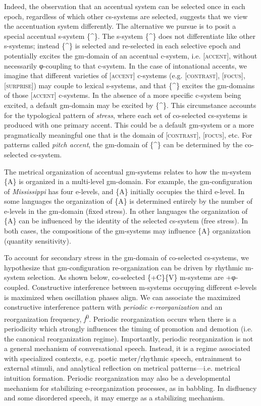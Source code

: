   Indeed, the observation that an accentual system can be selected once in each epoch, regardless of which other cs-systems are selected, suggests that we view the accentuation system differently. The alternative we pursue is to posit a special accentual s-system \{\^{}\}. The s-system \{\^{}\} does not differentiate like other s-systems; instead \{\^{}\} is selected and re-selected in each selective epoch and potentially excites the gm-domain of an accentual c-system, i.e. [\textsc{accent}], without necessarily φ-coupling to that c-system. In the case of intonational accents, we imagine that different varieties of [\textsc{accent}] c-systems (e.g. [\textsc{contrast}], [\textsc{focus}], [\textsc{surprise}]) may couple to lexical s-systems, and that \{\^{}\} excites the gm-domains of those [\textsc{accent}] c-systems. In the absence of a more specific c-system being excited, a default gm-domain may be excited by \{\^{}\}. This circumstance accounts for the typological pattern of \textit{stress}, where each set of co-selected cs-systems is produced with one primary accent. This could be a default gm-system or a more pragmatically meaningful one that is the domain of [\textsc{contrast}], [\textsc{focus}], etc. For patterns called \textit{pitch accent}, the gm-domain of \{\^{}\} can be determined by the co-selected cs-system.

  The metrical organization of accentual gm-systems relates to how the m-system \{A\} is organized in a multi-level gm-domain. For example, the gm-configuration of \textit{Mississippi} has four e-levels, and \{A\} initially occupies the third e-level. In some languages the organization of \{A\} is determined entirely by the number of e-levels in the gm-domain (fixed stress). In other languages the organization of \{A\} can be influenced by the identity of the selected cs-system (free stress). In both cases, the compositions of the gm-systems may influence \{A\} organization (quantity sensitivity). 

  To account for secondary stress in the gm-domain of co-selected cs-systems, we hypothesize that gm-configuration re-organization can be driven by rhythmic m-system selection. As shown below, co-selected \{+C\}\{V\} m-systems are +φ-coupled. Constructive interference between m-systems occupying different e-levels is maximized when oscillation phases align. We can associate the maximized constructive interference pattern with \textit{periodic e-reorganization} and an reorganization frequency, \textit{f}\textsuperscript{0}. Periodic reorganization occurs when there is a periodicity which strongly influences the timing of promotion and demotion (i.e. the canonical reorganization regime). Importantly, periodic reorganization is not a general mechanism of conversational speech. Instead, it is a regime associated with specialized contexts, e.g. poetic meter/rhythmic speech, entrainment to external stimuli, and analytical reflection on metrical patterns—i.e. metrical intuition formation. Periodic reorganization may also be a developmental mechanism for stabilizing e-reorganization processes, as in babbling. In disfluency and some disordered speech, it may emerge as a stabilizing mechanism.

